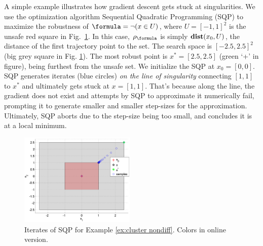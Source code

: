 \begin{exmp}
	\label{ex:cluster nondiff}
	A simple example illustrates how gradient descent gets stuck at singularities. We use the optimization algorithm Sequential Quadratic Programming (SQP) \cite{Polak97_Optim} to maximize the robustness of $\formula = \neg (x \in U)$, where $U=[-1,1]^2$ is the unsafe red square in Fig.~\ref{fig:DumbExample}.
	In this case, $\robf$ is simply $\mathbf{dist}(x_0,U)$, the distance of the first trajectory point to the set.
	The search space is $[-2.5,2.5]^2$ (big grey square in Fig. \ref{fig:DumbExample}). 
	The most robust point is $x^* = [2.5,2.5]$ (green `+' in figure), being furthest from the unsafe set.
	We initialize the SQP at $x_0=[0,0]$. 
	SQP generates iterates (blue circles) \textit{on the line of singularity} connecting $[1,1]$ to $x^*$ and ultimately gets stuck at $x=[1,1]$.
	That's because along the line, the gradient does not exist and attempts by SQP to approximate it numerically fail, prompting it to generate smaller and smaller step-sizes for the approximation.
	Ultimately, SQP aborts due to the step-size being too small, and concludes it is at a local minimum.
\end{exmp}	
\begin{figure}[t]
\centering
\includegraphics[width=0.49\textwidth]{figures/DumbOptEx_scissored}
\vspace{-20pt}
\caption{{\small Iterates of SQP for Example \ref{ex:cluster nondiff}. Colors in online version.}}
\vspace{-10pt}
\label{fig:DumbExample}
\end{figure}


